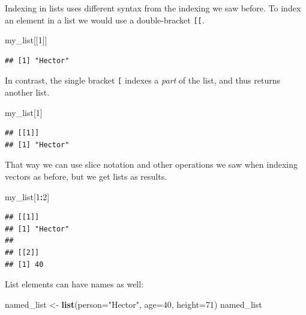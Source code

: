 \documentclass[12pt,]{book}
\newenvironment{Shaded}{\begin{snugshade}}{\end{snugshade}}
\newcommand{\KeywordTok}[1]{\textcolor[rgb]{0.13,0.29,0.53}{\textbf{#1}}}
\newcommand{\DataTypeTok}[1]{\textcolor[rgb]{0.13,0.29,0.53}{#1}}
\newcommand{\DecValTok}[1]{\textcolor[rgb]{0.00,0.00,0.81}{#1}}
\newcommand{\StringTok}[1]{\textcolor[rgb]{0.31,0.60,0.02}{#1}}
\newcommand{\OperatorTok}[1]{\textcolor[rgb]{0.81,0.36,0.00}{\textbf{#1}}}
\newcommand{\NormalTok}[1]{#1}
\theoremstyle{definition}
\theoremstyle{definition}
\theoremstyle{definition}
\theoremstyle{remark}
\begin{document}
Indexing in lists uses different syntax from the indexing we saw before.
To index an element in a list we would use a double-bracket
\texttt{{[}{[}}.

\begin{Shaded}
\begin{Highlighting}[]
\NormalTok{my_list[[}\DecValTok{1}\NormalTok{]]}
\end{Highlighting}
\end{Shaded}

\begin{verbatim}
## [1] "Hector"
\end{verbatim}

In contrast, the single bracket \texttt{{[}} indexes a \emph{part} of
the list, and thus returns another list.

\begin{Shaded}
\begin{Highlighting}[]
\NormalTok{my_list[}\DecValTok{1}\NormalTok{]}
\end{Highlighting}
\end{Shaded}

\begin{verbatim}
## [[1]]
## [1] "Hector"
\end{verbatim}

That way we can use slice notation and other operations we saw when
indexing vectors as before, but we get lists as results.

\begin{Shaded}
\begin{Highlighting}[]
\NormalTok{my_list[}\DecValTok{1}\OperatorTok{:}\DecValTok{2}\NormalTok{]}
\end{Highlighting}
\end{Shaded}

\begin{verbatim}
## [[1]]
## [1] "Hector"
## 
## [[2]]
## [1] 40
\end{verbatim}

List elements can have names as well:

\begin{Shaded}
\begin{Highlighting}[]
\NormalTok{named_list <-}\StringTok{ }\KeywordTok{list}\NormalTok{(}\DataTypeTok{person=}\StringTok{"Hector"}\NormalTok{, }\DataTypeTok{age=}\DecValTok{40}\NormalTok{, }\DataTypeTok{height=}\DecValTok{71}\NormalTok{)}
\NormalTok{named_list}
\end{Highlighting}
\end{Shaded}
\end{document}
